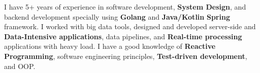 

\begin{cvparagraph}

I have 5+ years of experience in software development, \textbf{System Design}, and backend development specially using \textbf{Golang} and \textbf{Java/Kotlin} \textbf{Spring} framework.
I worked with big data tools, designed and developed server-side and \textbf{Data-Intensive applications}, data pipelines, and \textbf{Real-time processing} applications with heavy load.
I have a good knowledge of \textbf{Reactive Programming}, software engineering principles, \textbf{Test-driven development}, and OOP.
\end{cvparagraph}